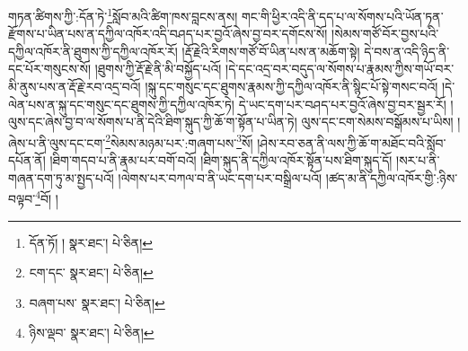 གཏན་ཚིགས་ཀྱི་:དོན་ཏེ་\footnote{དོན་ཏོ། །  སྣར་ཐང་།  པེ་ཅིན། }སློབ་མའི་ཚིག་ཁས་བླངས་ནས། གང་གི་ཕྱིར་འདི་ནི་དད་པ་ལ་སོགས་པའི་ཡོན་ཏན་རྫོགས་པ་ཡིན་པས་ན་དཀྱིལ་འཁོར་འདི་བཤད་པར་བྱའོ་ཞེས་བྱ་བར་དགོངས་སོ། །སེམས་གཙོ་བོར་བྱས་པའི་དཀྱིལ་འཁོར་ནི་ཐུགས་ཀྱི་དཀྱིལ་འཁོར་རོ། །རྡོ་རྗེའི་རིགས་གཙོ་བོ་ཡིན་པས་ན་མཆོག་སྟེ། དེ་བས་ན་འདི་ཉིད་ནི་དང་པོར་གསུངས་སོ། །ཐུགས་ཀྱི་རྡོ་རྗེ་ནི་མི་བསྐྱོད་པའོ། །དེ་དང་འདྲ་བར་བདུད་ལ་སོགས་པ་རྣམས་ཀྱིས་གཡོ་བར་མི་ནུས་པས་ན་རྡོ་རྗེ་རབ་འདྲ་བའོ། །སྐུ་དང་གསུང་དང་ཐུགས་རྣམས་ཀྱི་དཀྱིལ་འཁོར་ནི་སྙིང་པོ་སྟེ་གསང་བའོ། །དེ་ལེན་པས་ན་སྐུ་དང་གསུང་དང་ཐུགས་ཀྱི་དཀྱིལ་འཁོར་ཏེ། དེ་ཡང་དག་པར་བཤད་པར་བྱའོ་ཞེས་བྱ་བར་སྦྱར་རོ། །ལུས་དང་ཞེས་བྱ་བ་ལ་སོགས་པ་ནི་དེའི་ཐིག་སྐུད་ཀྱི་ཆོ་ག་སྟོན་པ་ཡིན་ཏེ། ལུས་དང་ངག་སེམས་བསྒོམས་པ་ཡིས། །ཞེས་པ་ནི་ལུས་དང་ངག་\footnote{ངག་དང་  སྣར་ཐང་།  པེ་ཅིན། }སེམས་མཉམ་པར་:གཞག་པས་\footnote{བཞག་པས་  སྣར་ཐང་།  པེ་ཅིན། }སོ། །ཤེས་རབ་ཅན་ནི་ལས་ཀྱི་ཆོ་ག་མཐོང་བའི་སློབ་དཔོན་ནོ། །ཐིག་གདབ་པ་ནི་རྣམ་པར་བགོ་བའོ། །ཐིག་སྐུད་ནི་དཀྱིལ་འཁོར་སྟོན་པས་ཐིག་སྐུད་དོ། །སར་པ་ནི་གཞན་དག་ཏུ་མ་སྤྱད་པའོ། །ལེགས་པར་བཀལ་བ་ནི་ཡང་དག་པར་བསྒྲིལ་པའོ། །ཚད་མ་ནི་དཀྱིལ་འཁོར་གྱི་:ཉིས་བལྟབ་\footnote{ཉིས་ལྡབ་  སྣར་ཐང་།  པེ་ཅིན། }བོ། །
